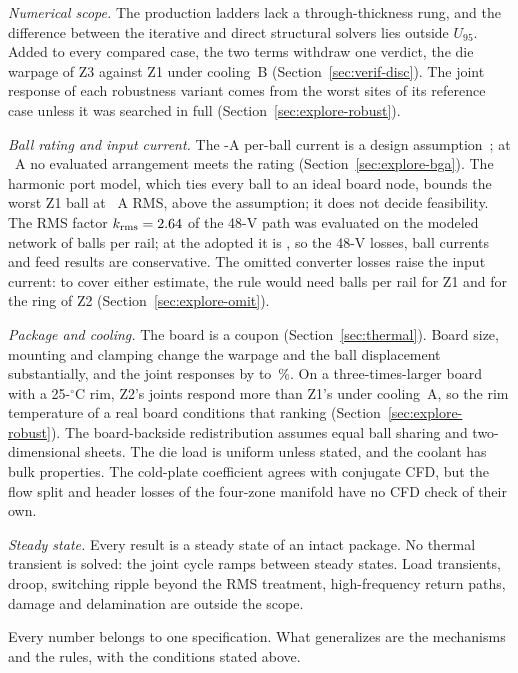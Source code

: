 \emph{Numerical scope.} The production ladders lack a through-thickness rung, and the difference
between the iterative and direct structural solvers lies outside $U_{95}$. Added to every compared
case, the two terms withdraw one verdict, the die warpage of Z3 against Z1 under cooling~B
(Section~\ref{sec:verif-disc}). The joint response of each robustness variant comes from the
\MvScrK{} worst sites of its reference case unless it was searched in full
(Section~\ref{sec:explore-robust}).

\emph{Ball rating and input current.} The \WrBgaRule-A per-ball current is a design
assumption~\cite{Kuan2015Imax}; at \WrBgaRuleSens~A no evaluated arrangement meets the rating
(Section~\ref{sec:explore-bga}). The harmonic port model, which ties every ball to an ideal board
node, bounds the worst Z1 ball at \WrBgaRmsZone~A RMS, above the assumption; it does not decide
feasibility. The RMS factor $k_{\mathrm{rms}} = 2.64$ of the 48-V path was evaluated on the
modeled network of \BgaNmodel{} balls per rail; at the adopted \WrBgaNZone{} it is
\BgaKeqAtCountZone, so the 48-V losses, ball currents and feed results are conservative. The
omitted converter losses raise the input current: to cover either estimate, the rule would need
\OmitBgaNZone{} balls per rail for Z1 and \OmitBgaNZtwo{} for the ring of Z2
(Section~\ref{sec:explore-omit}).

\emph{Package and cooling.} The board is a coupon (Section~\ref{sec:thermal}). Board size,
mounting and clamping change the warpage and the ball displacement substantially, and the joint
responses by \MvScrBdEpsLo{} to \MvScrBdEpsHi\,\%. On a three-times-larger board with a
25-$^\circ$C rim, Z2's joints respond more than Z1's under cooling~A, so the rim temperature of a
real board conditions that ranking (Section~\ref{sec:explore-robust}). The board-backside
redistribution assumes equal ball sharing and two-dimensional sheets. The die load is uniform
unless stated, and the coolant has bulk properties. The cold-plate coefficient agrees with
conjugate CFD, but the flow split and header losses of the four-zone manifold have no CFD check of
their own.

\emph{Steady state.} Every result is a steady state of an intact package. No thermal transient is
solved: the joint cycle ramps between steady states. Load transients, droop, switching ripple beyond
the RMS treatment, high-frequency return paths, damage and delamination are outside the scope.

Every number belongs to one specification. What generalizes are the mechanisms and the rules, with
the conditions stated above.
